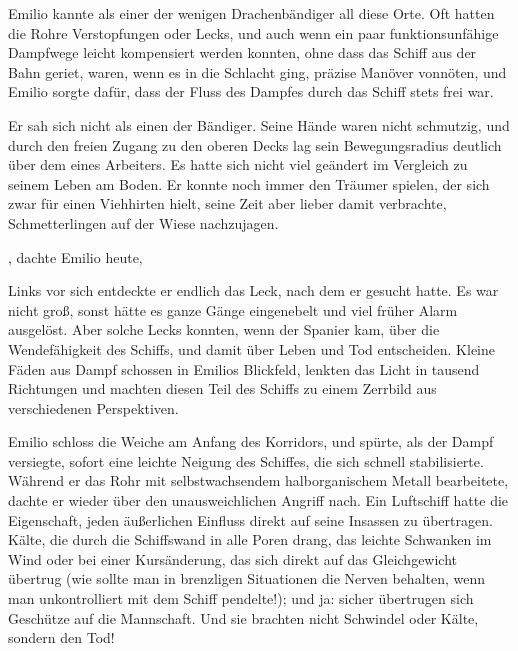 \bigpar

Emilio kannte als einer der wenigen Drachenbändiger all diese Orte.
Oft hatten die Rohre Verstopfungen oder Lecks, und auch wenn ein
paar funktionsunfähige Dampfwege leicht kompensiert werden konnten,
ohne dass das Schiff aus der Bahn geriet, waren, wenn es in die
Schlacht ging, präzise Manöver vonnöten, und Emilio sorgte dafür,
dass der Fluss des Dampfes durch das Schiff stets frei war.

Er sah sich nicht als einen der Bändiger. Seine Hände waren nicht
schmutzig, und durch den freien Zugang zu den oberen Decks lag sein
Bewegungsradius deutlich über dem eines Arbeiters. Es hatte sich
nicht viel geändert im Vergleich zu seinem Leben am Boden. Er
konnte noch immer den Träumer spielen, der sich zwar für einen
Viehhirten hielt, seine Zeit aber lieber damit verbrachte,
Schmetterlingen auf der Wiese nachzujagen.

, dachte Emilio heute, 

\bigpar

Links vor sich entdeckte er endlich das Leck, nach dem er gesucht
hatte. Es war nicht groß, sonst hätte es ganze Gänge eingenebelt
und viel früher Alarm ausgelöst. Aber solche Lecks konnten, wenn
der Spanier kam, über die Wendefähigkeit des Schiffs, und damit
über Leben und Tod entscheiden. Kleine Fäden aus Dampf schossen in
Emilios Blickfeld, lenkten das Licht in tausend Richtungen und
machten diesen Teil des Schiffs zu einem Zerrbild aus verschiedenen
Perspektiven.

Emilio schloss die Weiche am Anfang des Korridors, und spürte, als
der Dampf versiegte, sofort eine leichte Neigung des Schiffes, die
sich schnell stabilisierte. Während er das Rohr mit
selbstwachsendem halborganischem Metall bearbeitete, dachte er
wieder über den unausweichlichen Angriff nach. Ein Luftschiff hatte
die Eigenschaft, jeden äußerlichen Einfluss direkt auf seine
Insassen zu übertragen. Kälte, die durch die Schiffswand in alle
Poren drang, das leichte Schwanken im Wind oder bei einer
Kursänderung, das sich direkt auf das Gleichgewicht übertrug (wie
sollte man in brenzligen Situationen die Nerven behalten, wenn man
unkontrolliert mit dem Schiff pendelte!); und ja: sicher übertrugen
sich Geschütze auf die Mannschaft. Und sie brachten nicht Schwindel
oder Kälte, sondern den Tod!

